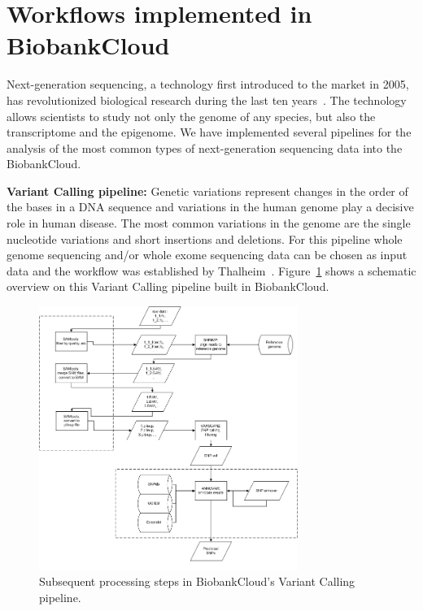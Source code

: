 \section{Workflows implemented in BiobankCloud}
Next-generation sequencing, a technology first introduced to the market in 2005, has revolutionized biological research during the last ten years~\cite{shendure2008next}. The technology allows scientists to study not only the genome of any species, but also the transcriptome and the epigenome.
We have implemented several pipelines for the analysis of the most common types of next-generation sequencing data into the BiobankCloud. 

\textbf{Variant Calling pipeline:} Genetic variations represent changes in the order of the bases in a DNA sequence and variations in the human genome play a decisive role in human disease. The most common variations in the genome are the single nucleotide variations and short insertions and deletions. For this pipeline whole genome sequencing and/or whole exome sequencing data can be chosen as input data and the workflow was established by Thalheim~\cite{snp_wf_thalheim}. Figure~\ref{fig:workflow_snp} shows a schematic overview on this Variant Calling pipeline built in BiobankCloud.

\begin{figure}[h]
\centering
\includegraphics[width=0.75\textwidth]{./imgs/wf_snp.png}
\caption{Subsequent processing steps in BiobankCloud's Variant Calling pipeline.}
\label{fig:workflow_snp}
\end{figure}

